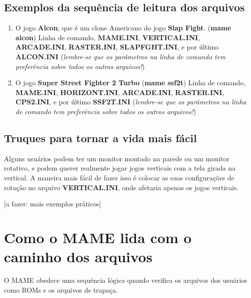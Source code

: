 \documentclass[letterpaper,10pt,brazil]{sphinxmanual}
\begin{document}
\subsection{Exemplos da sequência de leitura dos arquivos}
\label{advanced/multiconfig:exemplos-da-sequencia-de-leitura-dos-arquivos}\begin{enumerate}
\item {} 
O jogo \textbf{Alcon}, que é um clone Americano do jogo
\textbf{Slap Fight}.  (\textbf{mame alcon})
Linha de comando, \textbf{MAME.INI}, \textbf{VERTICAL.INI},
\textbf{ARCADE.INI}, \textbf{RASTER.INI}, \textbf{SLAPFGHT.INI}, e por último
\textbf{ALCON.INI}
(\emph{lembre-se que os parâmetros na linha de comando tem
preferência sobre todos os outros arquivos!})

\item {} 
O jogo \textbf{Super Street Fighter 2 Turbo} (\textbf{mame ssf2t})
Linha de comando, \textbf{MAME.INI}, \textbf{HORIZONT.INI},
\textbf{ARCADE.INI}, \textbf{RASTER.INI}, \textbf{CPS2.INI}, e por último
\textbf{SSF2T.INI}
(\emph{lembre-se que os parâmetros na linha de comando tem
preferência sobre todos os outros arquivos!})

\end{enumerate}


\subsection{Truques para tornar a vida mais fácil}
\label{advanced/multiconfig:truques-para-tornar-a-vida-mais-facil}
Alguns usuários podem ter um monitor montado na parede ou um monitor
rotativo, e podem querer realmente jogar jogos verticais com a tela
girada na vertical. A maneira mais fácil de fazer isso é colocar as suas
configurações de rotação no arquivo \textbf{VERTICAL.INI}, onde afetaria
apenas os jogos verticais.

{[}a fazer: mais exemplos práticos{]}


\section{Como o MAME lida com o caminho dos arquivos}
\label{advanced/paths:como-o-mame-lida-com-o-caminho-dos-arquivos}\label{advanced/paths::doc}
O MAME obedece uma sequência lógica quando verifica os arquivos dos
usuários como ROMs e os arquivos de trapaça.
\end{document}

